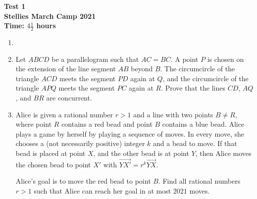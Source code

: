 \documentclass{article}
\begin{document}
\thispagestyle{empty}

\begin{center}
  \textbf{\Large Test 1}
  \\ \vspace{1em}
  \textbf{\large Stellies March Camp 2021}
  \\ \vspace{1em}
  \textbf{\large Time: $4\frac{1}{2}$ hours}
\end{center}

\vspace{24pt}

\begin{enumerate}

\item %


\item %
Let $ABCD$ be a parallelogram such that $AC = BC$.
A point $P$ is chosen on the extension of the line segment $AB$ beyond $B$.
The circumcircle of the triangle $ACD$ meets the segment $PD$ again at $Q$, and the circumcircle of the triangle $APQ$ meets the segment $PC$ again at $R$.
Prove that the lines $CD$, $AQ$, and $BR$ are concurrent.

\item %
Alice is given a rational number $r > 1$ and a line with two points $B \neq R$, where point $R$ contains a red bead and point $B$ contains a blue bead.
Alice plays a game by herself by playing a sequence of moves.
In every move, she chooses a (not necessarily positive) integer $k$ and a bead to move.
If that bead is placed at point $X$, and the other bead is at point $Y$, then Alice moves the chosen bead to point $X'$ with $\overrightarrow{YX'} = r^k \overrightarrow{YX}$.

Alice's goal is to move the red bead to point $B$.
Find all rational numbers $r > 1$ such that Alice can reach her goal in at most $2021$ moves.

\end{enumerate}

\vfill
\centering
\begin{BVerbatim}
\end{BVerbatim}
\end{document}
